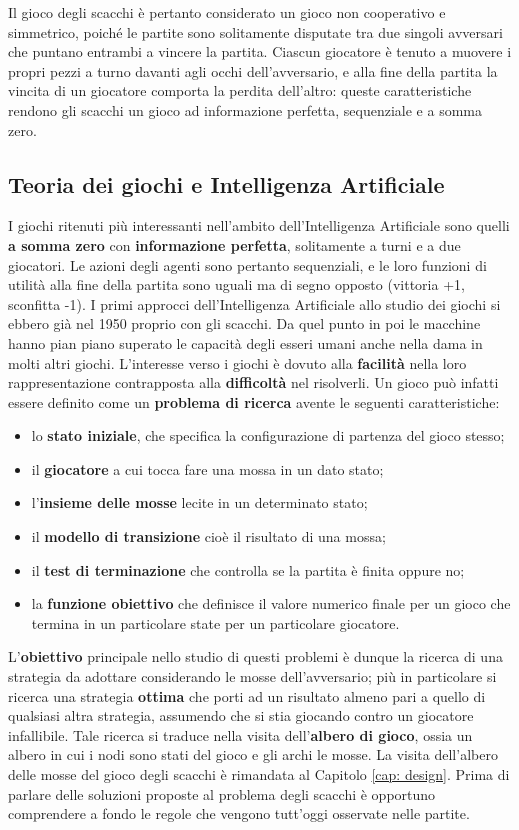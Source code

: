 Il gioco degli scacchi è pertanto considerato un gioco non cooperativo e simmetrico, poiché le partite sono solitamente disputate tra due singoli avversari che puntano entrambi a vincere la partita. Ciascun giocatore è tenuto a muovere i propri pezzi a turno davanti agli occhi dell'avversario, e alla fine della partita la vincita di un giocatore comporta la perdita dell'altro: queste caratteristiche rendono gli scacchi un gioco ad informazione perfetta, sequenziale e a somma zero. 
\subsection{Teoria dei giochi e Intelligenza Artificiale}
I giochi ritenuti più interessanti nell'ambito dell'Intelligenza Artificiale sono quelli \textbf{a somma zero} con \textbf{informazione perfetta}, solitamente a turni e a due giocatori. Le azioni degli agenti sono pertanto sequenziali, e le loro funzioni di utilità alla fine della partita sono uguali ma di segno opposto (vittoria +1, sconfitta -1). I primi approcci dell'Intelligenza Artificiale allo studio dei giochi si ebbero già nel 1950 proprio con gli scacchi. Da quel punto in poi le macchine hanno pian piano superato le capacità degli esseri umani anche nella dama in molti altri giochi. L'interesse verso i giochi è dovuto alla \textbf{facilità} nella loro rappresentazione contrapposta alla \textbf{difficoltà} nel risolverli\cite{russell2005intelligenza}. Un gioco può infatti essere definito come un \textbf{problema di ricerca} avente le seguenti caratteristiche:
\begin{itemize}
    \item lo \textbf{stato iniziale}, che specifica la configurazione di partenza del gioco stesso;
    \item il \textbf{giocatore} a cui tocca fare una mossa in un dato stato;
    \item l'\textbf{insieme delle mosse} lecite in un determinato stato;
    \item il \textbf{modello di transizione} cioè il risultato di una mossa;
    \item il \textbf{test di terminazione} che controlla se la partita è finita oppure no;
    \item la \textbf{funzione obiettivo} che definisce il valore numerico finale per un gioco che termina in un particolare state per un particolare giocatore.
\end{itemize}
L'\textbf{obiettivo} principale nello studio di questi problemi è dunque la ricerca di una strategia da adottare considerando le mosse dell'avversario; più in particolare si ricerca una strategia \textbf{ottima} che porti ad un risultato almeno pari a quello di qualsiasi altra strategia, assumendo che si stia giocando contro un giocatore infallibile. Tale ricerca si traduce nella visita dell'\textbf{albero di gioco}, ossia un albero in cui i nodi sono stati del gioco e gli archi le mosse. La visita dell'albero delle mosse del gioco degli scacchi è rimandata al Capitolo \ref{cap: design}. Prima di parlare delle soluzioni proposte al problema degli scacchi è opportuno comprendere a fondo le regole che vengono tutt'oggi osservate nelle partite.

